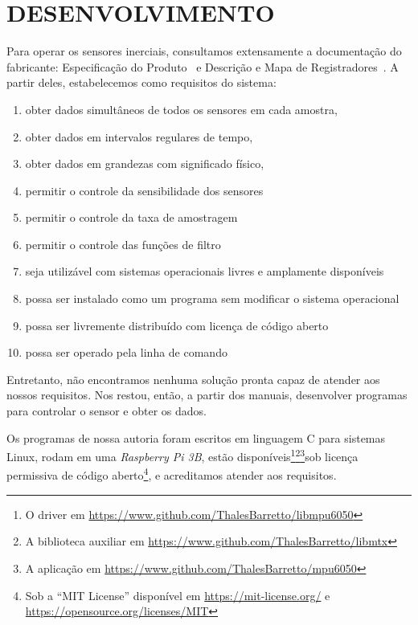 \chapter{DESENVOLVIMENTO}\label{chap:desenvolvimento}

Para operar os sensores inerciais, consultamos extensamente a documentação do fabricante: Especificação do Produto~\cite{mpu6050ps} e Descrição e Mapa de Registradores~\cite{mpu6050rm}.
A partir deles, estabelecemos como requisitos do sistema:
\begin{enumerate}
        \item obter dados simultâneos de todos os sensores em cada amostra,
        \item obter dados em intervalos regulares de tempo,
        \item obter dados em grandezas com significado físico,
        \item permitir o controle da sensibilidade dos sensores
        \item permitir o controle da taxa de amostragem
        \item permitir o controle das funções de filtro
        \item seja utilizável com sistemas operacionais livres e amplamente disponíveis
        \item possa ser instalado como um programa sem modificar o sistema operacional
        \item possa ser livremente distribuído com licença de código aberto
        \item possa ser operado pela linha de comando
\end{enumerate}

Entretanto, não encontramos nenhuma solução pronta capaz de atender aos nossos requisitos. Nos restou, então, a partir dos manuais, desenvolver programas para controlar o sensor e obter os dados.

Os programas de nossa autoria foram escritos em linguagem C para sistemas Linux, rodam em uma \emph{Raspberry Pi 3B}, estão disponíveis\footnote{O driver em \href{https://www.github.com/ThalesBarretto/libmpu6050}{https://www.github.com/ThalesBarretto/libmpu6050}}\footnote{A biblioteca auxiliar em \href{https://www.github.com/ThalesBarretto/libmtx}{https://www.github.com/ThalesBarretto/libmtx}}\footnote{A aplicação em \href{https://www.github.com/ThalesBarretto/mpu6050}{https://www.github.com/ThalesBarretto/mpu6050}}sob licença permissiva de código aberto\footnote{Sob a ``MIT License'' disponível em \href{https://mit-license.org/}{https://mit-license.org/} e \href{https://opensource.org/licenses/MIT}{https://opensource.org/licenses/MIT}}, e acreditamos atender aos requisitos.

